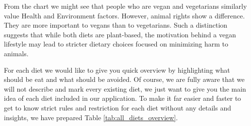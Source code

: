 From the chart we might see that people who are vegan and vegetarians similarly value Health and Environment factors. However, animal rights show a difference. They are more important to vegans than to vegetarians.
Such a distinction suggests that while both diets are plant-based, the motivation behind a vegan lifestyle may lead to stricter dietary choices focused on minimizing harm to animals.
\par
For each diet we would like to give you quick overview by highlighting what should be eat and what should be avoided. Of course, we are fully aware that we will not describe and mark every existing diet, we just want to give you the main idea of each diet included in our application. To make it far easier and faster to get to know strict rules and restriction for each diet without any details and insights, we have prepared Table \ref{tab:all_diets_overview}.

\begin{table}[H]
\caption{Products categories included in each diet}
\label{tab:all_diets_overview}
\end{table}
 
